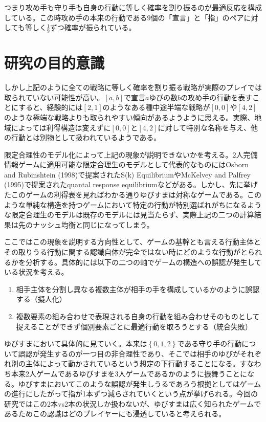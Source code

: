 \documentclass{jsarticle}
\begin{document}
つまり攻め手も守り手も自身の行動に等しく確率を割り振るのが最適反応を構成している。この時攻め手の本来の行動である$9$個の「宣言」と「指」のペアに対しても等しく$\frac{1}{9}$ずつ確率が振られている。

\section{研究の目的意識}
しかし上記のように全ての戦略に等しく確率を割り振る戦略が実際のプレイでは取られていない可能性が高い。$[a,b]$で宣言$a$ゆびの数$b$の攻め手の行動を表すことにすると、経験的には$[2,1]$のようなある種中途半端な戦略が$[0,0]$や$[4,2]$のような極端な戦略よりも取られやすい傾向があるようように思える。実際、地域によっては利得構造は変えずに$[0,0]$と$[4,2]$に対して特別な名称を与え、他の行動とは別物として扱われているようである。

限定合理性のモデル化によって上記の現象が説明できないかを考える。2人完備情報ゲームに適用可能な限定合理生のモデルとして代表的なものにはOsborn and Rubinshtein (1998)で提案されたS(k) EquilibriumやMcKelvey and Palfrey (1995)で提案されたquantal response equilibriumなどがある。しかし、先に挙げたこのゲームの利得表を見ればわかる通りゆびすまは対称なゲームである。このような単純な構造を持つゲームにおいて特定の行動が特別選ばれがちになるような限定合理生のモデルは既存のモデルには見当たらず、実際上記の二つの計算結果は先のナッシュ均衡と同じになってしまう。

ここではこの現象を説明する方向性として、ゲームの基幹とも言える行動主体とその取りうる行動に関する認識自体が完全ではない時にどのような行動がとられるかを分析する。具体的には以下の二つの軸でゲームの構造への誤認が発生している状況を考える。
\begin{enumerate}
	\item 相手主体を分割し異なる複数主体が相手の手を構成しているかのように誤認する（擬人化）
	\item 複数要素の組み合わせで表現される自身の行動を組み合わせそのものとして捉えることができず個別要素ごとに最適行動を取ろうとする（統合失敗）
\end{enumerate}

ゆびすまにおいて具体的に見ていく。本来は$\left\{ 0,1,2 \right\}$である守り手の行動について誤認が発生するのが一つ目の非合理性であり、そこでは相手のゆびがそれぞれ別の主体によって動かされているという想定の下行動することになる。すなわち本来2人ゲームであるゆびすまを3人ゲームであるかのように振舞うことになる。ゆびすまにおいてこのような誤認が発生しうるであろう根拠としてはゲームの進行にしたがって指が1本ずつ減らされていくという点が挙げられる。今回の研究ではこの2本vs2本の状況しか扱わないが、ゆびすまは広く知られたゲームであるためこの認識はどのプレイヤーにも浸透していると考えられる。
\end{document}
